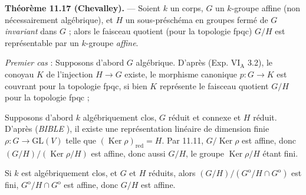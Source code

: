 \documentclass[11pt,a4paper]{article}
\begin{document}
\textbf{Théorème 11.17 (Chevalley).} — Soient $k$ un corps, $G$ un
$k$-groupe affine (non nécessairement algébrique), et $H$ un
sous-préschéma en groupes fermé de $G$ \emph{invariant} dans $G$ ; alors le
faisceau quotient (pour la topologie fpqc) $G/H$ est représentable par un
$k$-groupe \emph{affine}.


\emph{Premier cas} : Supposons d'abord $G$ algébrique. D'après (Exp.
$\mathrm{VI}_{\mathrm{A}}$ 3.2), le conoyau $K$ de l'injection
$H \to G$ existe,  le morphisme canonique
$p : G \longrightarrow K$ est  couvrant pour
la topologie fpqc, si bien   
$K$ représente le faisceau quotient $G/H$ pour la topologie fpqc ;


Supposons d'abord $k$ algébriquement clos, $G$ réduit et connexe et $H$
réduit. D'après (\emph{BIBLE} \struck{\ill{}} ), il existe une représentation linéaire de dimension finie
$\rho : G \longrightarrow \mathrm{GL}(V)$ telle que
$(\operatorname{Ker} \rho)_{\mathrm{red}} = H$. Par 11.11,
$G/\operatorname{Ker} \rho$ est affine, donc
$(G/H)/(\operatorname{Ker} \rho/H)$ est affine, donc aussi $G/H$, le groupe
$\operatorname{Ker} \rho/H$ étant fini.

Si $k$ est algébriquement clos, et $G$ et $H$ réduits, alors
$(G/H)/(G^{\mathrm{o}}/H \cap G^{\mathrm{o}})$ est fini, 
$G^{\mathrm{o}}/H \cap G^{\mathrm{o}}$ est affine, donc $G/H$ est affine.


\end{document}
